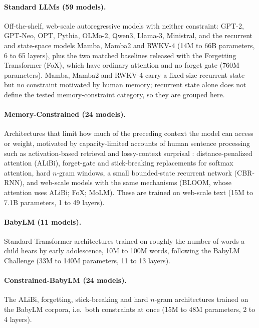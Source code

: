 \paragraph{Standard LLMs (59 models).} Off-the-shelf, web-scale autoregressive models with neither constraint: GPT-2, GPT-Neo, OPT, Pythia, OLMo-2, Qwen3, Llama-3, Ministral, and the recurrent and state-space models Mamba, Mamba2 and RWKV-4 (14M to 66B parameters, 6 to 65 layers), plus the two matched baselines released with the Forgetting Transformer (FoX), which have ordinary attention and no forget gate (760M parameters). Mamba, Mamba2 and RWKV-4 carry a fixed-size recurrent state but no constraint motivated by human memory; recurrent state alone does not define the tested memory-constraint category, so they are grouped here.

\paragraph{Memory-Constrained (24 models).} Architectures that limit how much of the preceding context the model can access or weight, motivated by capacity-limited accounts of human sentence processing such as activation-based retrieval \citep{lewisvasishth2005activation} and lossy-context surprisal \citep{futrell2020lossy}: distance-penalized attention (ALiBi), forget-gate and stick-breaking replacements for softmax attention, hard $n$-gram windows, a small bounded-state recurrent network (CBR-RNN), and web-scale models with the same mechanisms (BLOOM, whose attention uses ALiBi; FoX; MoLM). These are trained on web-scale text (15M to 7.1B parameters, 1 to 49 layers).

\paragraph{BabyLM (11 models).} Standard Transformer architectures trained on roughly the number of words a child hears by early adolescence, 10M to 100M words, following the BabyLM Challenge \citep{warstadt2023cfp,warstadt2023findings,hu2024secondbabylm} (33M to 140M parameters, 11 to 13 layers).

\paragraph{Constrained-BabyLM (24 models).} The ALiBi, forgetting, stick-breaking and hard $n$-gram architectures trained on the BabyLM corpora, i.e.\ both constraints at once (15M to 48M parameters, 2 to 4 layers).

